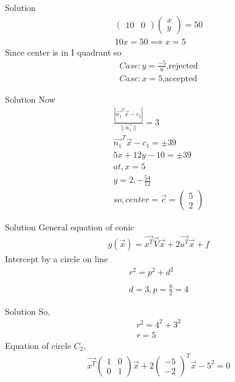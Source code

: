 \documentclass{beamer}
\begin{document}
\begin{frame}{Solution}
\begin{align}
\begin{pmatrix}10&0\end{pmatrix}\begin{pmatrix}x\\y\end{pmatrix}=50\\
10x=50\implies x=5
\end{align}
Since center is in I quadrant so
\begin{align}
    Case:y=\frac{-5}{6} \text{,rejected}\\
    Case:x=5 \text{,accepted}
\end{align}
\end{frame}
\begin{frame}{Solution}
Now
\begin{align}
    \frac{|\vec{n_1}^T\vec{x}-c_1|}{\lVert \vec{n_1}\rVert}=3\\
    \vec{n_1}^T\vec{x}-c_1=\pm 39\\
    5x+12y-10=\pm 39\\
    at,x=5\\
    y=2,-\frac{54}{12}\\
    so,center=\vec{c}=\begin{pmatrix}5\\2\end{pmatrix}
\end{align}
\end{frame}
\begin{frame}{Solution}
General equation of conic
\begin{align}
    g(\vec{x})=\vec{x^T}\vec{V}\vec{x}+2\vec{u^T}\vec{x}+f 
\end{align}
Intercept by a circle on line
\begin{align}
    r^2=p^2+d^2\\
    \\
    d=3,p=\frac{8}{2}=4
\end{align}
\end{frame}
\begin{frame}{Solution}
So,
\begin{align}
    r^2=4^2+3^2\\
    r=5
\end{align}
Equation of circle $C_2$,
\begin{align}
    \vec{x^T}\begin{pmatrix}1&0\\0&1\end{pmatrix}\vec{x}+2\begin{pmatrix}-5\\-2\end{pmatrix}^T\vec{x}-5^2=0
\end{align}
\end{frame}
\end{document}

